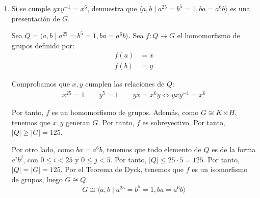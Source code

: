 \documentclass[12pt]{article}
\begin{document}
\begin{ejercicio}
\begin{enumerate}
            \item Si se cumple $yxy^{-1}=x^6$, demuestra que $\langle a, b\mid a^{25}=b^5=1, ba=a^6b\rangle$ es una presentación de $G$.
            
            Sea $Q=\langle a, b\mid a^{25}=b^5=1, ba=a^6b\rangle$. Sea $f:Q\to G$ el homomorfismo de grupos definido por:
            \begin{align*}
                f(a) & = x \\
                f(b) & = y
            \end{align*}

            Comprobamos que $x,y$ cumplen las relaciones de $Q$:
            \begin{align*}
                x^{25} = 1\qquad y^5 = 1\qquad yx=x^6y\iff yxy^{-1}=x^6
            \end{align*}

            Por tanto, $f$ es un homomorfismo de grupos. Además, como $G\cong K\rtimes H$, tenemos que $x,y$ generan $G$. Por tanto, $f$ es sobreyectivo. Por tanto, $|Q|\geq |G|=125$.

            Por otro lado, como $ba=a^6b$, tenemos que todo elemento de $Q$ es de la forma $a^i b^j$, con $0\leq i < 25$ y $0\leq j < 5$. Por tanto, $|Q|\leq 25\cdot 5=125$. Por tanto, $|Q|=|G|=125$. Por el Teorema de Dyck, tenemos que $f$ es un isomorfismo de grupos, luego $G\cong Q$.
            \begin{equation*}
                G\cong \langle a, b\mid a^{25}=b^5=1, ba=a^6b\rangle
            \end{equation*}
        \end{enumerate}
    \end{ejercicio}
\end{document}
